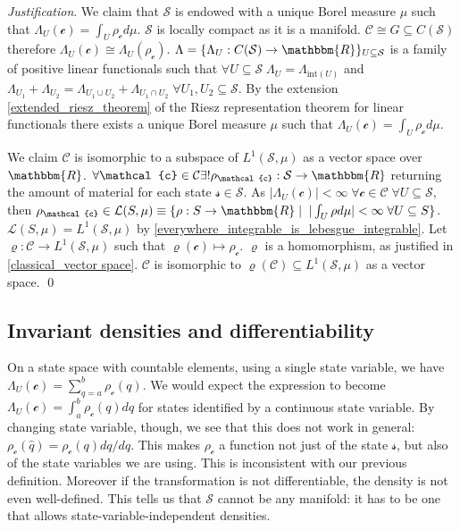\documentclass[aps,pra,10pt,twocolumn,floatfix,nofootinbib]{revtex4-1}
\numberwithin{equation}{section}
\theoremstyle{definition}
\newenvironment{justification}{\emph{Justification}.}{\qed}
\begin{document}
\begin{justification}
	We claim that $\mathcal{S}$ is endowed with a unique Borel measure $\mu$ such that $\Lambda_U (\mathcal{c}) = \int_U \rho_{\mathcal{c}} d \mu$.  $\mathcal{S}$ is locally compact as it is a manifold. $\mathcal{C} \cong G \subseteq C(\mathcal{S})$ therefore $\Lambda_U(\mathcal{c}) \cong \Lambda_U(\rho_\mathcal{c})$. $\Lambda = \{\Lambda_U : C(\mathcal{S}) \rightarrow \mathbbm{R}\}_{U \subseteq \mathcal{S}}$ is a family of positive linear functionals such that $\forall U \subseteq \mathcal{S} \; \Lambda_U = \Lambda_{\mathrm{int}(U)}$ and $\Lambda_{U_1} + \Lambda_{U_2} = \Lambda_{U_1 \cup U_2} + \Lambda_{U_1 \cap U_2} \; \forall U_1, U_2 \subseteq \mathcal{S}$. By the extension \ref{extended_riesz_theorem} of the Riesz representation theorem for linear functionals 
	there exists a unique Borel measure $\mu$ such that $\Lambda_U (\mathcal{c}) = \int_{U} \rho_\mathcal{c} d\mu$.

	We claim $\mathcal{C}$ is isomorphic to a subspace of $L^1(\mathcal{S}, \mu)$ as a vector space over $\mathbbm{R}$. $\forall \mathcal{c} \in \mathcal{C} \exists ! \rho_{\mathcal{c}}:\mathcal{S} \rightarrow \mathbbm{R}$ returning the amount of material for each state $\mathcal{s} \in \mathcal{S}$. As $|\Lambda_{U}(\mathcal{c})| < \infty \; \forall \mathcal{c} \in \mathcal{C} \; \forall U \subseteq \mathcal{S}$, then $\rho_{\mathcal{c}} \in \mathcal{L}(S,\mu) \equiv \{ \rho : S \rightarrow \mathbbm{R} \; | \;\; |\int_{U} \rho d\mu| < \infty \; \forall U \subseteq S\}$. $\mathcal{L}(S,\mu) = L^1(\mathcal{S}, \mu)$ by \ref{everywhere_integrable_is_lebesgue_integrable}. Let $\varrho : \mathcal{C} \rightarrow L^1(\mathcal{S}, \mu)$ such that $\varrho(\mathcal{c}) \mapsto \rho_\mathcal{c}$. $\varrho$ is a homomorphism, as justified in \ref{classical_vector space}. $\mathcal{C}$ is isomorphic to $\varrho(\mathcal{C}) \subseteq L^1(\mathcal{S}, \mu)$ as a vector space.
\end{justification}

\subsection{Invariant densities and differentiability}

On a state space with countable elements, using a single state variable, we have $\Lambda_U (\mathcal{c}) = \sum \limits_{q=a}^b \rho_\mathcal{c}(q)$. We would expect the expression to become $\Lambda_U (\mathcal{c}) = \int_a^b \rho_\mathcal{c} (q) dq$ for states identified by a continuous state variable. By changing state variable, though, we see that this does not work in general: $\rho_\mathcal{c}(\hat{q})= \rho_\mathcal{c}(q) dq/d\hat{q}$. This makes $\rho_\mathcal{c}$ a function not just of the state $\mathcal{s}$, but also of the state variables we are using. This is inconsistent with our previous definition. Moreover if the transformation is not differentiable, the density is not even well-defined. This tells us that $\mathcal{S}$ cannot be any manifold: it has to be one that allows state-variable-independent densities.
\end{document}
